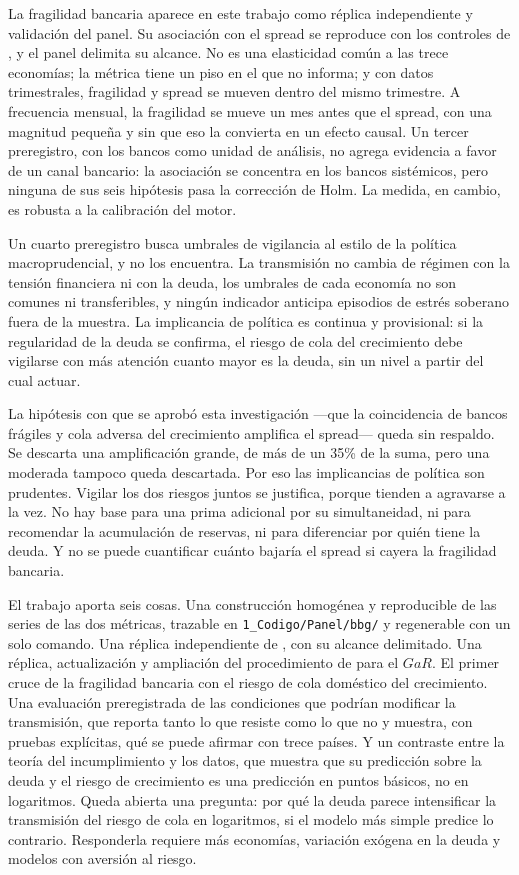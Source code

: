 La fragilidad bancaria aparece en este trabajo como réplica independiente y validación del panel. Su asociación con el spread se reproduce con los controles de \citet{Chari2024b}, y el panel delimita su alcance. No es una elasticidad común a las trece economías; la métrica tiene un piso en el que no informa; y con datos trimestrales, fragilidad y spread se mueven dentro del mismo trimestre. A frecuencia mensual, la fragilidad se mueve un mes antes que el spread, con una magnitud pequeña y sin que eso la convierta en un efecto causal. Un tercer preregistro, con los bancos como unidad de análisis, no agrega evidencia a favor de un canal bancario: la asociación se concentra en los bancos sistémicos, pero ninguna de sus seis hipótesis pasa la corrección de Holm. La medida, en cambio, es robusta a la calibración del motor.

Un cuarto preregistro busca umbrales de vigilancia al estilo de la política macroprudencial, y no los encuentra. La transmisión no cambia de régimen con la tensión financiera ni con la deuda, los umbrales de cada economía no son comunes ni transferibles, y ningún indicador anticipa episodios de estrés soberano fuera de la muestra. La implicancia de política es continua y provisional: si la regularidad de la deuda se confirma, el riesgo de cola del crecimiento debe vigilarse con más atención cuanto mayor es la deuda, sin un nivel a partir del cual actuar.

La hipótesis con que se aprobó esta investigación ---que la coincidencia de bancos frágiles y cola adversa del crecimiento amplifica el spread--- queda sin respaldo. Se descarta una amplificación grande, de más de un 35\% de la suma, pero una moderada tampoco queda descartada. Por eso las implicancias de política son prudentes. Vigilar los dos riesgos juntos se justifica, porque tienden a agravarse a la vez. No hay base para una prima adicional por su simultaneidad, ni para recomendar la acumulación de reservas, ni para diferenciar por quién tiene la deuda. Y no se puede cuantificar cuánto bajaría el spread si cayera la fragilidad bancaria.

El trabajo aporta seis cosas. Una construcción homogénea y reproducible de las series de las dos métricas, trazable en \texttt{1\_Codigo/Panel/bbg/} y regenerable con un solo comando. Una réplica independiente de \citet{Chari2024b}, con su alcance delimitado. Una réplica, actualización y ampliación del procedimiento de \citet{OssandonBusch2022} para el $GaR$. El primer cruce de la fragilidad bancaria con el riesgo de cola doméstico del crecimiento. Una evaluación preregistrada de las condiciones que podrían modificar la transmisión, que reporta tanto lo que resiste como lo que no y muestra, con pruebas explícitas, qué se puede afirmar con trece países. Y un contraste entre la teoría del incumplimiento y los datos, que muestra que su predicción sobre la deuda y el riesgo de crecimiento es una predicción en puntos básicos, no en logaritmos. Queda abierta una pregunta: por qué la deuda parece intensificar la transmisión del riesgo de cola en logaritmos, si el modelo más simple predice lo contrario. Responderla requiere más economías, variación exógena en la deuda y modelos con aversión al riesgo.
